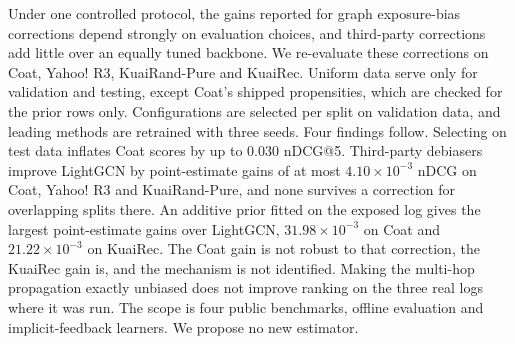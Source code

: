 Under one controlled protocol, the gains reported for graph exposure-bias corrections depend strongly on evaluation choices, and third-party corrections add little over an equally tuned backbone. We re-evaluate these corrections on Coat, Yahoo! R3, KuaiRand-Pure and KuaiRec. Uniform data serve only for validation and testing, except Coat's shipped propensities, which are checked for the prior rows only. Configurations are selected per split on validation data, and leading methods are retrained with three seeds. Four findings follow. Selecting on test data inflates Coat scores by up to $0.030$ nDCG@5. Third-party debiasers improve LightGCN by point-estimate gains of at most $4.10\times10^{-3}$ nDCG on Coat, Yahoo! R3 and KuaiRand-Pure, and none survives a correction for overlapping splits there. An additive prior fitted on the exposed log gives the largest point-estimate gains over LightGCN, $31.98\times10^{-3}$ on Coat and $21.22\times10^{-3}$ on KuaiRec. The Coat gain is not robust to that correction, the KuaiRec gain is, and the mechanism is not identified. Making the multi-hop propagation exactly unbiased does not improve ranking on the three real logs where it was run. The scope is four public benchmarks, offline evaluation and implicit-feedback learners. We propose no new estimator.
